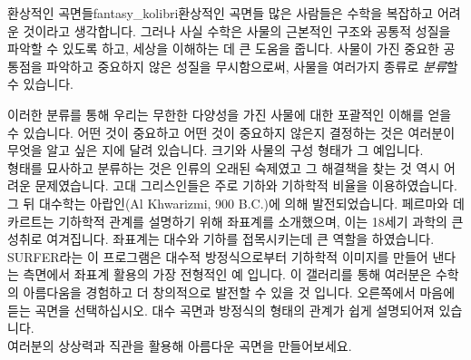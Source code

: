 ﻿\begin{surferIntroPage}{환상적인 곡면들}{fantasy_kolibri}{환상적인 곡면들}
많은 사람들은 수학을 복잡하고 어려운 것이라고 생각합니다. 그러나 사실 수학은 사물의 근본적인 구조와 공통적 성질을 파악할 수 있도록 하고, 세상을 이해하는 데 큰 도움을 줍니다. 
사물이 가진 중요한 공통점을 파악하고 중요하지 않은 성질을 무시함으로써, 사물을 여러가지 종류로 \textit{분류}할 수 있습니다. 

이러한 분류를 통해 우리는 무한한 다양성을 가진 사물에 대한 포괄적인 이해를 얻을 수 있습니다. 어떤 것이 중요하고 어떤 것이 중요하지 않은지 결정하는 것은 여러분이 무엇을 알고 싶은 지에 달려 있습니다. 크기와 사물의 구성 형태가 그 예입니다.
\\
\vspace{0.4cm}
형태를 묘사하고 분류하는 것은 인류의 오래된 숙제였고 그 해결책을 찾는 것 역시 어려운 문제였습니다. 고대 그리스인들은 주로 기하와 기하학적 비율을 이용하였습니다. 그 뒤 대수학는 아랍인(Al Khwarizmi, 900 B.C.)에 의해 발전되었습니다. 페르마와 데카르트는 기하학적 관계를 설명하기 위해 좌표계를 소개했으며, 이는 18세기 과학의 큰 성취로 여겨집니다. 좌표계는 대수와 기하를 접목시키는데 큰 역할을 하였습니다.
\\
\vspace{0.4cm}
SURFER라는 이 프로그램은 대수적 방정식으로부터 기하학적 이미지를 만들어 낸다는 측면에서 좌표계 활용의 가장 전형적인 예 입니다.  이 갤러리를 통해 여러분은 수학의 아름다움을 경험하고 더 창의적으로 발전할 수 있을 것 입니다. 오른쪽에서 마음에 듣는 곡면을 선택하십시오. 대수 곡면과 방정식의 형태의 관계가 쉽게 설명되어져 있습니다. \\
여러분의 상상력과 직관을 활용해 아름다운 곡면을 만들어보세요.
\end{surferIntroPage}
